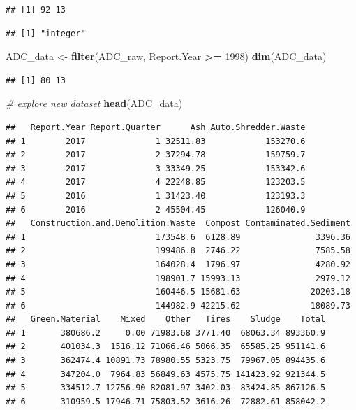\documentclass[12pt,]{article}
\newenvironment{Shaded}{\begin{snugshade}}{\end{snugshade}}
\newcommand{\KeywordTok}[1]{\textcolor[rgb]{0.13,0.29,0.53}{\textbf{#1}}}
\newcommand{\DecValTok}[1]{\textcolor[rgb]{0.00,0.00,0.81}{#1}}
\newcommand{\StringTok}[1]{\textcolor[rgb]{0.31,0.60,0.02}{#1}}
\newcommand{\CommentTok}[1]{\textcolor[rgb]{0.56,0.35,0.01}{\textit{#1}}}
\newcommand{\OperatorTok}[1]{\textcolor[rgb]{0.81,0.36,0.00}{\textbf{#1}}}
\newcommand{\NormalTok}[1]{#1}
\begin{document}
\begin{verbatim}
## [1] 92 13
\end{verbatim}

\begin{Shaded}
\end{Shaded}

\begin{verbatim}
## [1] "integer"
\end{verbatim}

\begin{Shaded}
\begin{Highlighting}[]
\NormalTok{ADC_data <-}\StringTok{ }\KeywordTok{filter}\NormalTok{(ADC_raw, Report.Year }\OperatorTok{>=}\StringTok{ }\DecValTok{1998}\NormalTok{)}
\KeywordTok{dim}\NormalTok{(ADC_data)}
\end{Highlighting}
\end{Shaded}

\begin{verbatim}
## [1] 80 13
\end{verbatim}

\begin{Shaded}
\begin{Highlighting}[]
\CommentTok{# explore new dataset}
\KeywordTok{head}\NormalTok{(ADC_data)}
\end{Highlighting}
\end{Shaded}

\begin{verbatim}
##   Report.Year Report.Quarter      Ash Auto.Shredder.Waste
## 1        2017              1 32511.83            153270.6
## 2        2017              2 37294.78            159759.7
## 3        2017              3 33349.25            153342.6
## 4        2017              4 22248.85            123203.5
## 5        2016              1 31423.40            123193.3
## 6        2016              2 45504.45            126040.9
##   Construction.and.Demolition.Waste  Compost Contaminated.Sediment
## 1                          173548.6  6128.89               3396.36
## 2                          199486.8  2746.22               7585.58
## 3                          164028.4  1796.97               4280.92
## 4                          198901.7 15993.13               2979.12
## 5                          160446.5 15681.63              20203.18
## 6                          144982.9 42215.62              18089.73
##   Green.Material    Mixed    Other   Tires    Sludge    Total
## 1       380686.2     0.00 71983.68 3771.40  68063.34 893360.9
## 2       401034.3  1516.12 71066.46 5066.35  65585.25 951141.6
## 3       362474.4 10891.73 78980.55 5323.75  79967.05 894435.6
## 4       347204.0  7964.83 56849.63 4575.75 141423.92 921344.5
## 5       334512.7 12756.90 82081.97 3402.03  83424.85 867126.5
## 6       310959.5 17946.71 75803.52 3616.26  72882.61 858042.2
\end{verbatim}
\end{document}
